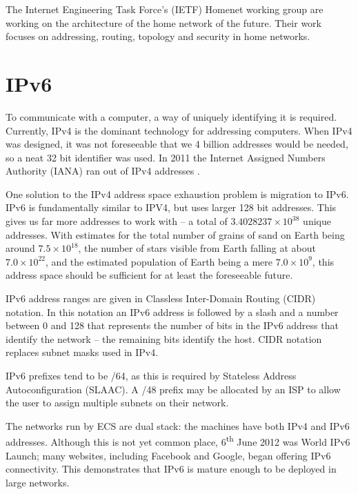 The Internet Engineering Task Force's (IETF) Homenet working group
\cite{homenet} are working on the architecture of the home network of the
future. Their work focuses on addressing, routing, topology and security
in home networks. 

\section{IPv6}
To communicate with a computer, a way of uniquely identifying it is required.
Currently, IPv4 is the dominant technology for addressing computers. When IPv4
was designed, it was not foreseeable that we 4 billion addresses would be
needed, so a neat 32 bit identifier was used.  In 2011 the Internet Assigned
Numbers Authority (IANA)  ran out of IPv4 addresses \cite{potaroo}. 

One solution to the IPv4 address space exhaustion problem is migration to IPv6.
IPv6 is fundamentally similar to IPV4, but uses larger 128 bit addresses. This
gives us far more addresses to work with -- a total of $3.4028237\times10^{38}$
unique addresses. With estimates for the total number of grains of sand on
Earth being around $7.5\times10^{18}$, the number of stars visible from Earth
falling at about $7.0\times10^{22}$, and the estimated population of Earth
being a mere $7.0\times10^{9}$, this address space should be sufficient for at
least the foreseeable future. 

IPv6 address ranges are given in Classless Inter-Domain Routing (CIDR)
 notation. In this notation
an IPv6 address is followed by a slash and a number between 0 and 128 that
represents the number of bits in the IPv6 address that identify the network --
the remaining bits identify the host. CIDR notation replaces subnet masks used
in IPv4.

IPv6 prefixes tend to be /64, as this is required by Stateless Address
Autoconfiguration (SLAAC). A /48 prefix may be allocated by an ISP to allow the user
to assign multiple subnets on their network.

The networks run by ECS are dual stack: the machines have both IPv4 and IPv6
addresses. Although this is not yet common place, 6\textsuperscript{th} June
2012 was World IPv6 Launch; many websites, including Facebook and Google, began
offering IPv6 connectivity\cite{IPv6Launch}. This demonstrates that IPv6 is
mature enough to be deployed in large networks.

